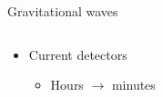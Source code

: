 \documentclass[usenames,dvipsnames,t]{beamer}
\begin{document}
\begin{frame}{Gravitational waves}
\begin{columns}
\begin{column}[t]{0.60\linewidth}
\begin{itemize}
        \vspace{\x}
    
        \item \green{\checkmark} Current detectors
        \begin{itemize}
          \item Hours $\rightarrow$ minutes
        \end{itemize}
    
        \vspace{\x}

      \end{itemize}
    \end{column}


\end{columns}
\end{frame}
\end{document}
